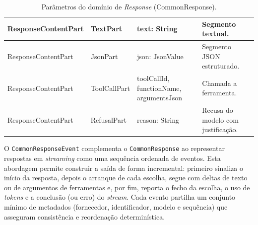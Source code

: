 \begin{table}[H]
\begin{tabularx}{\textwidth}{|>{\raggedright\arraybackslash}p{3.4cm}|>{\raggedright\arraybackslash}p{2.2cm}|>{\raggedright\arraybackslash}p{3.8cm}|>{\raggedright\arraybackslash}X|}
        ResponseContentPart & TextPart & text: String & Segmento textual. \\ \hline
        ResponseContentPart & JsonPart & json: JsonValue & Segmento JSON estruturado. \\ \hline
        ResponseContentPart & ToolCallPart & toolCallId, \newline functionName, \newline argumentsJson & Chamada a ferramenta. \\ \hline
        ResponseContentPart & RefusalPart & reason: String & Recusa do modelo com justificação. \\ \hline

    \end{tabularx}
    \caption{Parâmetros do domínio de \textit{Response} (CommonResponse).}
    \label{tab:response-parametros}
\end{table}

    O \texttt{CommonResponseEvent} complementa o \texttt{CommonResponse} ao representar respostas em \textit{streaming} como uma sequência ordenada de eventos. Esta abordagem permite construir a saída de forma incremental: primeiro sinaliza o início da resposta, depois o arranque de cada escolha, segue com deltas de texto ou de argumentos de ferramentas e, por fim, reporta o fecho da escolha, o uso de \textit{tokens} e a conclusão (ou erro) do \textit{stream}. Cada evento partilha um conjunto mínimo de metadados (fornecedor, identificador, modelo e sequência) que asseguram consistência e reordenação determinística.

